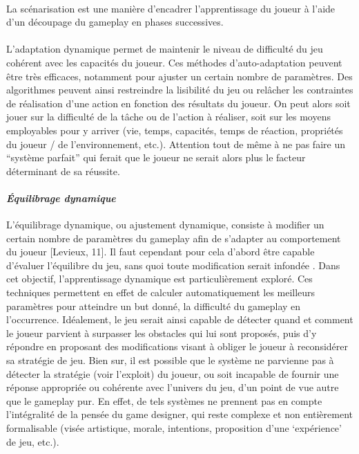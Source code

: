 \paragraph{}La scénarisation est une manière d’encadrer l’apprentissage du joueur à l’aide d’un découpage du gameplay en phases successives. 

\paragraph{}L’adaptation dynamique permet de maintenir le niveau de difficulté du jeu cohérent avec les capacités du joueur. Ces méthodes d’auto-adaptation peuvent être très efficaces, notamment pour ajuster un certain nombre de paramètres. Des algorithmes peuvent ainsi restreindre la lisibilité du jeu ou relâcher les contraintes de réalisation d’une action en fonction des résultats du joueur. On peut alors soit jouer sur la difficulté de la tâche ou de l’action à réaliser, soit sur les moyens employables pour y arriver (vie, temps, capacités, temps de réaction, propriétés du joueur / de l’environnement, etc.). Attention tout de même à ne pas faire un “système parfait” qui ferait que le joueur ne serait alors plus le facteur déterminant de sa réussite.

		\paragraph{\emph{Équilibrage dynamique} \\ \quad}
L’équilibrage dynamique, ou ajustement dynamique, consiste à modifier un certain nombre de paramètres du gameplay afin de s’adapter au comportement du joueur [Levieux, 11]. Il faut cependant pour cela d’abord être capable d’évaluer l’équilibre du jeu, sans quoi toute modification serait infondée . Dans cet objectif, l’apprentissage dynamique est particulièrement exploré. Ces techniques permettent en effet de calculer automatiquement les meilleurs paramètres pour atteindre un but donné, la difficulté du gameplay en l'occurrence. Idéalement, le jeu serait ainsi capable de détecter quand et comment le joueur parvient à surpasser les obstacles qui lui sont proposés, puis d’y répondre en proposant des modifications visant à obliger le joueur à reconsidérer sa stratégie de jeu. Bien sur, il est possible que le système ne parvienne pas à détecter la stratégie (voir l’exploit) du joueur, ou soit incapable de fournir une réponse appropriée ou cohérente avec l’univers du jeu, d’un point de vue autre que le gameplay pur. En effet, de tels systèmes ne prennent pas en compte l’intégralité de la pensée du game designer, qui reste complexe et non entièrement formalisable (visée artistique, morale, intentions, proposition d’une ‘expérience’ de jeu, etc.).

